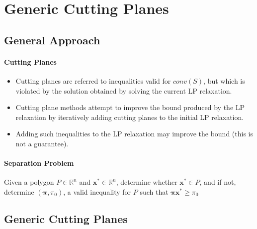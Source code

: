     \section{Generic Cutting Planes}
        \subsection{General Approach}
            \paragraph{Cutting Planes}
            \begin{itemize}
                \item Cutting planes are referred to inequalities valid for $conv(S)$, but which is violated by the solution obtained by solving the current LP relaxation.
                \item Cutting plane methods attempt to improve the bound produced by the LP relaxation by iteratively adding cutting planes to the initial LP relaxation.
                \item Adding such inequalities to the LP relaxation may improve the bound (this is not a guarantee).
            \end{itemize}

            \paragraph{Separation Problem} Given a polygon $P \in \mathbb{R}^n$ and $\mathbf{x}^* \in \mathbb{R}^n$, determine whether $\mathbf{x}^* \in P$, and if not, determine $(\mathbf{\pi}, \pi_0)$, a valid inequality for $P$ such that $\mathbf{\pi} \mathbf{x}^* \ge \pi_0$

        \subsection{Generic Cutting Planes}

